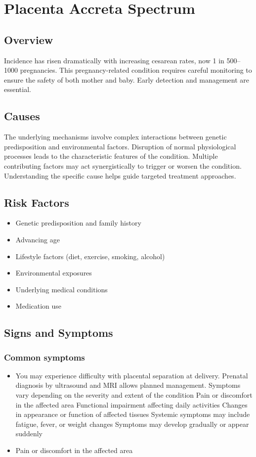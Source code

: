 \chapter{Placenta Accreta Spectrum}
\label{sec:Placenta Accreta Spectrum}

\section{Overview}
Incidence has risen dramatically with increasing cesarean rates, now 1 in 500--1000 pregnancies. This pregnancy-related condition requires careful monitoring to ensure the safety of both mother and baby. Early detection and management are essential.
\section{Causes}
The underlying mechanisms involve complex interactions between genetic predisposition and environmental factors. Disruption of normal physiological processes leads to the characteristic features of the condition. Multiple contributing factors may act synergistically to trigger or worsen the condition. Understanding the specific cause helps guide targeted treatment approaches.
\section{Risk Factors}


\begin{itemize}[noitemsep]
  \item Genetic predisposition and family history
  \item Advancing age
  \item Lifestyle factors (diet, exercise, smoking, alcohol)
  \item Environmental exposures
  \item Underlying medical conditions
  \item Medication use
\end{itemize}
\section{Signs and Symptoms}

\subsection{Common symptoms}
\begin{itemize}[noitemsep]
  \item You may experience difficulty with placental separation at delivery. Prenatal diagnosis by ultrasound and MRI allows planned management. Symptoms vary depending on the severity and extent of the condition Pain or discomfort in the affected area Functional impairment affecting daily activities Changes in appearance or function of affected tissues Systemic symptoms may include fatigue, fever, or weight changes Symptoms may develop gradually or appear suddenly
  \item Pain or discomfort in the affected area
  \end{itemize}

